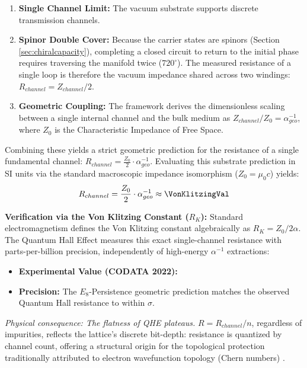 \begin{enumerate}
    \item \textbf{Single Channel Limit:} The vacuum substrate supports discrete transmission channels.
    
    \item \textbf{Spinor Double Cover:} Because the carrier states are spinors (Section \ref{sec:chiralcapacity}), completing a closed circuit to return to the initial phase requires traversing the manifold twice ($720^\circ$). The measured resistance of a single loop is therefore the vacuum impedance shared across two windings: $R_{channel} = Z_{channel}/2$.
    
    \item \textbf{Geometric Coupling:} The framework derives the dimensionless scaling between a single internal channel and the bulk medium as $Z_{channel} / Z_0 = \alpha_{geo}^{-1}$, where $Z_0$ is the Characteristic Impedance of Free Space.
\end{enumerate}

Combining these yields a strict geometric prediction for the resistance of a single fundamental channel: $R_{channel} = \frac{Z_0}{2} \cdot \alpha^{-1}_{geo}$. Evaluating this substrate prediction in SI units via the standard macroscopic impedance isomorphism ($Z_0 = \mu_0 c$) yields:
\begin{equation}
    R_{channel} = \frac{Z_0}{2} \cdot \alpha^{-1}_{geo} \approx \mathbf{\VonKlitzingVal}
\end{equation}

\textbf{Verification via the Von Klitzing Constant ($R_K$):}
Standard electromagnetism defines the Von Klitzing constant algebraically as $R_K = Z_0 / 2\alpha$. The Quantum Hall Effect measures this exact single-channel resistance with parts-per-billion precision, independently of high-energy $\alpha^{-1}$ extractions:
\begin{itemize}
    \item \textbf{Experimental Value (CODATA 2022):} \VonKlitzingRkExperimentalVal
    \item \textbf{Precision:} The $E_8$-Persistence geometric prediction matches the observed Quantum Hall resistance to within \VonKlitzingRkSigma $\sigma$.
\end{itemize}

\textit{Physical consequence: The flatness of QHE plateaus.} $R = R_{channel}/n$, regardless of impurities, reflects the lattice's discrete bit-depth: resistance is quantized by channel count, offering a structural origin for the topological protection traditionally attributed to electron wavefunction topology (Chern numbers) \cite{thouless_quantized_1982, kohmoto_topological_1985}.

